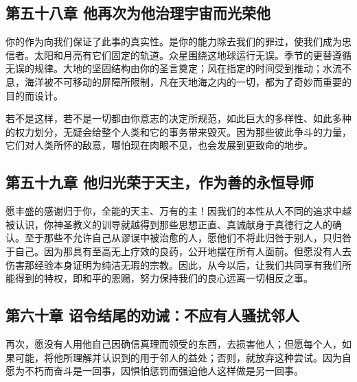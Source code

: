 
\subsection{第五十八章 他再次为他治理宇宙而光荣他}

你的作为向我们保证了此事的真实性。是你的能力除去我们的罪过，使我们成为忠信者。太阳和月亮有它们固定的轨道。众星围绕这地球运行无误。季节的更替遵循无误的规律。大地的坚固结构由你的圣言奠定；风在指定的时间受到推动；水流不息，海洋被不可移动的屏障所限制，凡在天地海之内的一切，都为了奇妙而重要的目的而设计。\par

若不是这样，若不是一切都由你意志的决定所规范，如此巨大的多样性、如此多种的权力划分，无疑会给整个人类和它的事务带来毁灭。因为那些彼此争斗的力量，它们对人类所怀的敌意，哪怕现在肉眼不见，也会发展到更致命的地步。\par


\subsection{第五十九章 他归光荣于天主，作为善的永恒导师}

愿丰盛的感谢归于你，全能的天主、万有的主！因我们的本性从人不同的追求中越被认识，你神圣教义的训导就越得到那些思想正直、真诚献身于真德行之人的确认。至于那些不允许自己从谬误中被治愈的人，愿他们不将此归咎于别人，只归咎于自己。因为那具有至高无上疗效的良药，公开地摆在所有人面前。但愿没有人去伤害那经验本身证明为纯洁无瑕的宗教。因此，从今以后，让我们共同享有我们所能得到的特权，即和平的恩赐，努力保持我们的良心远离一切相反之事。\par


\subsection{第六十章 诏令结尾的劝诫：不应有人骚扰邻人}

再次，愿没有人用他自己因确信真理而领受的东西，去损害他人；但愿每个人，如果可能，将他所理解并认识到的用于邻人的益处；否则，就放弃这种尝试。因为自愿为不朽而奋斗是一回事，因惧怕惩罚而强迫他人这样做是另一回事。\par

